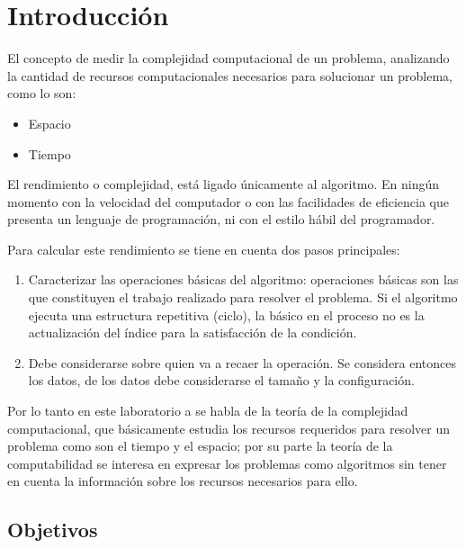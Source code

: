 \section{Introducción}

El concepto de medir la complejidad computacional de un problema, analizando la cantidad de recursos computacionales necesarios para solucionar un problema, como lo son:

\begin{itemize}
    \item Espacio
    \item Tiempo
\end{itemize}

El rendimiento o complejidad, está ligado únicamente al algoritmo. En ningún momento con la velocidad del computador o con las facilidades de eficiencia que presenta un lenguaje de programación, ni con el estilo hábil del programador.

Para calcular este rendimiento se tiene en cuenta dos pasos principales:

\begin{enumerate}
    \item Caracterizar las operaciones básicas del algoritmo: operaciones básicas son las que constituyen el trabajo realizado para resolver el problema. Si el algoritmo ejecuta una estructura repetitiva (ciclo), la básico en el proceso no es la actualización del índice para la satisfacción de la condición.
    \item Debe considerarse sobre quien va a recaer la operación. Se considera entonces los datos, de los datos debe considerarse el tamaño y la configuración. 
\end{enumerate}

Por lo tanto en este laboratorio a se habla de la teoría de la complejidad computacional, que básicamente  estudia los recursos requeridos para resolver un problema como son el tiempo y el espacio; por su parte la teoría de la computabilidad se interesa en expresar los problemas como algoritmos sin tener en cuenta la información sobre los recursos necesarios para ello.


\subsection{Objetivos}



